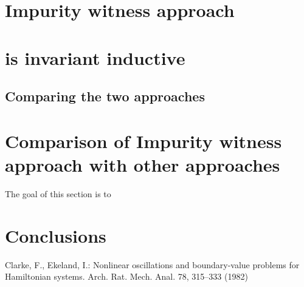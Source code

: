 \documentclass{llncs}
\newcommand{\foo}{\textit{foo}}
\newcommand{\inv}{\mathit{inv}}
\newcommand{\pathCondition}{\mathit{T_{\foo}}}
\newcommand{\mi}[1]{\mathit{#1}}
\newcommand{\g}{\textit{g}}
\begin{document}
\section{Impurity witness approach}
\section{is invariant inductive}


\subsection{Comparing the two approaches}
\section{Comparison of Impurity witness approach with other approaches}
The goal of this section is to 

\section{Conclusions}
%

%
%
\begin{thebibliography}{5}
%
Clarke, F., Ekeland, I.:
Nonlinear oscillations and
boundary-value problems for Hamiltonian systems.
Arch. Rat. Mech. Anal. 78, 315--333 (1982)


\end{thebibliography}
\end{document}
